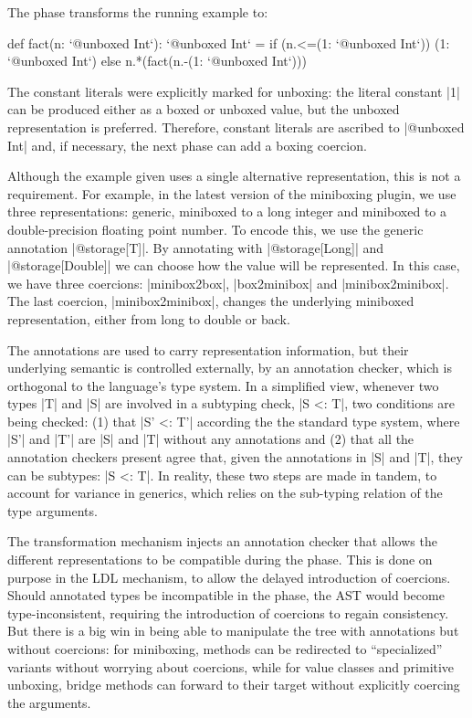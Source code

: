 The \inject{} phase transforms the running example to:

\begin{lstlisting-nobreak}
 def fact(n: `@unboxed Int`): `@unboxed Int` =
   if (n.<=(1: `@unboxed Int`))
     (1: `@unboxed Int`)
   else
     n.*(fact(n.-(1: `@unboxed Int`)))
\end{lstlisting-nobreak}

The constant literals were explicitly marked for unboxing: the literal constant |1| can be produced either as a boxed or unboxed value, but the unboxed representation is preferred. Therefore, constant literals are ascribed to |@unboxed Int| and, if necessary, the next phase can add a boxing coercion.

Although the example given uses a single alternative representation, this is not a requirement. For example, in the latest version of the miniboxing plugin, we use three representations: generic, miniboxed to a long integer and miniboxed to a double-precision floating point number. To encode this, we use the generic annotation |@storage[T]|. By annotating with |@storage[Long]| and |@storage[Double]| we can choose how the value will be represented. In this case, we have three coercions: |minibox2box|, |box2minibox| and |minibox2minibox|. The last coercion, |minibox2minibox|, changes the underlying miniboxed representation, either from long to double or back.

The annotations are used to carry representation information, but their underlying semantic is controlled externally, by an annotation checker, which is orthogonal to the language's type system. In a simplified view, whenever two types |T| and |S| are involved in a subtyping check, |S <: T|, two conditions are being checked: (1) that |S' <: T'| according the the standard type system, where |S'| and |T'| are |S| and |T| without any annotations and (2) that all the annotation checkers present agree that, given the annotations in |S| and |T|, they can be subtypes: |S <: T|. In reality, these two steps are made in tandem, to account for variance in generics, which relies on the sub-typing relation of the type arguments.

The transformation mechanism injects an annotation checker that allows the different representations to be compatible during the \inject{} phase. This is done on purpose in the LDL mechanism, to allow the delayed introduction of coercions. Should annotated types be incompatible in the \inject{} phase, the AST would become type-inconsistent, requiring the introduction of coercions to regain consistency. But there is a big win in being able to manipulate the tree with annotations but without coercions: for miniboxing, methods can be redirected to ``specialized'' variants without worrying about coercions, while for value classes and primitive unboxing, bridge methods can forward to their target without explicitly coercing the arguments.

